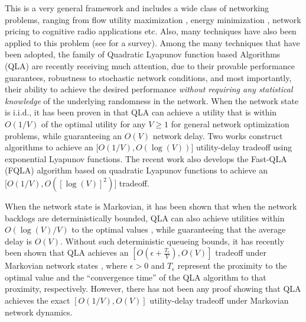 \documentclass[journal]{IEEEtran}
\begin{document}
This is a very general framework and includes a wide class of networking problems, ranging from flow utility maximization \cite{eryilmaz_qbsc_ton07}, energy minimization \cite{neelyenergy}, network pricing \cite{huangneelypricing} to cognitive radio applications \cite{rahulneelycognitive} etc. Also,  many techniques have also been applied to this problem (see \cite{yichiang_netopt08} for a survey).  
Among the many techniques that have been adopted, the family of Quadratic Lyapunov function based Algorithms (QLA) \cite{neelynowbook} are recently receiving much attention, due to their provable performance guarantees, robustness to stochastic network conditions, and most importantly, their ability to achieve the desired performance \emph{without requiring any statistical knowledge} of the underlying randomness in the network. When the network state is i.i.d., it has been proven in \cite{neelynowbook} that QLA can achieve a utility that is within $O(1/V)$ of  the optimal utility for any $V\geq1$ for general network optimization problems, while guaranteeing an $O(V)$ network delay. Two works \cite{neelysuperfast} \cite{neelyenergydelay} construct algorithms to achieve an $\big[O(1/V), O(\log(V))\big]$ utility-delay tradeoff using exponential Lyapunov functions. The recent work \cite{huangneely_dr_wiopt09} also develops the Fast-QLA  (FQLA) algorithm based on quadratic Lyapunov functions to achieve an $\big[O(1/V), O([\log(V)]^2)\big]$ tradeoff. 

When the network state is Markovian, it has been shown that when the network backlogs are deterministically bounded, QLA can also achieve utilities within $O(\log(V)/V)$ to the optimal values \cite{huangneelypricing} \cite{rahulneelycognitive}, while guaranteeing that the average delay is $O(V)$. Without such deterministic queueing bounds, it has recently been shown that QLA achieves an $[O(\epsilon+\frac{T_{\epsilon}}{V}), O(V)]$ tradeoff under Markovian network states \cite{neely_queuestability10}, where $\epsilon>0$ and $T_{\epsilon}$ represent the proximity to the optimal value and the ``convergence time'' of the QLA algorithm to that proximity, respectively. However, there has not been any proof showing that QLA achieves the exact $[O(1/V), O(V)]$ utility-delay tradeoff under Markovian network dynamics. 

\end{document}
